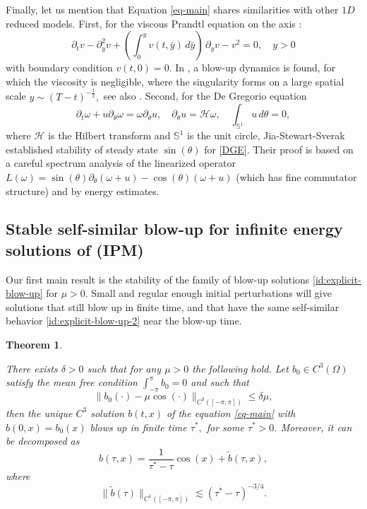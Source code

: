 \documentclass[12pt]{amsart}
\numberwithin{equation}{section}
\numberwithin{equation}{section}
\newtheorem{thm}{Theorem}[section]
\begin{document}
\medskip


Finally, let us mention that Equation \eqref{eq-main} shares similarities with other $1D$ reduced models. First, for the viscous Prandtl equation on the axis \cite{EE}: 
\begin{equation}
\partial_t v -\partial_y^2 v +\left( \int_0^y v(t,  \bar y)\,d\bar y\right)\,\partial_y v -v^2=0,\quad y>0
\end{equation}
with  boundary condition  $v(t,   0)=0.$  
In \cite{CGIM},   a blow-up dynamics is found,  for which the viscosity is negligible,  where the singularity forms on a large spatial scale $y\sim (T-t)^{-\frac{1}{2}},$  see also  \cite{CGM, CGM2, KVW}. Second, for the De Gregorio equation
\begin{equation}\label{DGE}
\partial_t\omega +u\partial_\theta \omega=\omega\partial_\theta u,\quad \partial_\theta u=\mathcal{H}\omega,\quad \int_{\mathbb{S}^1} u\,d\theta=0,
\end{equation}
where $\mathcal{H}$ is the Hilbert transform and $\mathbb{S}^1$ is the unit circle, Jia-Stewart-Sverak \cite{JSS} established stability of steady state $\sin(\theta)$ for \eqref{DGE}.   Their proof is based on a careful spectrum analysis of the linearized operator $L(\omega)=\sin(\theta)\partial_\theta(\omega+ u)-\cos(\theta)(\omega+u)$ (which has fine commutator structure)  and by energy estimates.
   

\subsection{Stable self-similar blow-up for infinite energy solutions of (IPM)}


Our first main result is the stability of the family of blow-up solutions \eqref{id:explicit-blow-up} for $\mu>0$. Small and regular enough initial perturbations will give solutions that still blow up in finite time, and that have the same self-similar behavior \eqref{id:explicit-blow-up-2} near the blow-up time. 
  
\begin{thm}\label{Th-IPM}

There exists $\delta>0$ such that for any $\mu>0$ the following hold. Let $b_0\in  C^{3}(\Omega)$ satisfy the mean free condition $\int_{-\pi}^\pi b_0=0$ and such that
\begin{equation}\label{Th-ic-IPM}
\|b_0(\cdot) -\mu \cos ( \cdot)\|_{C^3([-\pi,\pi])} \leq \delta \mu,
\end{equation}
then the unique $C^3$ solution $b(t, x)$ of the equation \eqref{eq-main} with $b(0, x)=b_0(x)$ blows up in finite time $\tau^*, $ for some $\tau^*>0$.   Moreover, it can be decomposed as
\begin{equation}\label{b-behavior}
b(\tau,x)=\frac{1}{\tau^*-\tau}\cos(x)+\tilde b(\tau,x),
\end{equation}
where
\begin{equation}\label{b-behavior-remainder}
\| \tilde b(\tau)\|_{C^1([-\pi,\pi])}\lesssim (\tau^*-\tau)^{-3/4}.
\end{equation}

\end{thm}
\end{document}
